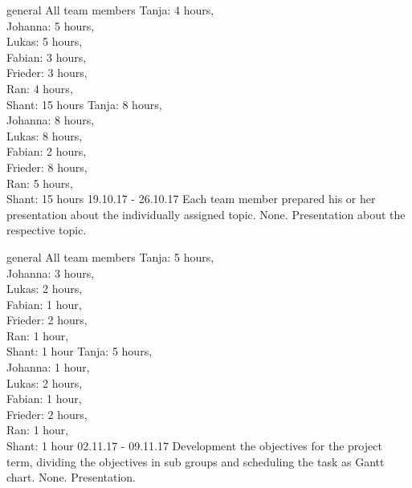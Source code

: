 	{general}%
	{All team members}%
	{Tanja: 4 hours, \\
	Johanna: 5 hours,\\
	Lukas: 5 hours,\\
	Fabian: 3 hours,\\
	Frieder: 3 hours,\\
	Ran: 4 hours,\\
	Shant: 15 hours}%
	{Tanja: 8 hours,\\ 
	Johanna: 8 hours,\\
	Lukas: 8 hours,\\
	Fabian: 2 hours,\\
	Frieder: 8 hours,\\
	Ran: 5 hours,\\
	Shant: 15 hours}%
	{19.10.17 - 26.10.17}%
	{Each team member prepared his or her presentation about the individually assigned topic. }%
	{None.}%
	{Presentation about the respective topic.}%


	{general}%
	{All team members}%
	{Tanja: 5 hours, \\
	Johanna: 3 hours,\\
	Lukas: 2 hours,\\
	Fabian:  1 hour,\\
	Frieder: 2 hours,\\
	Ran: 1 hour,\\
	Shant: 1 hour}%
	{Tanja: 5 hours, \\
	Johanna: 1 hour,\\
	Lukas: 2 hours,\\
	Fabian:  1 hour,\\
	Frieder: 2 hours,\\
	Ran: 1 hour,\\
	Shant: 1 hour}%
	{02.11.17 - 09.11.17}%
	{Development the objectives for the project term, dividing the objectives in sub groups and scheduling the task as Gantt chart.}%
	{None.}%
	{Presentation.}%
	
